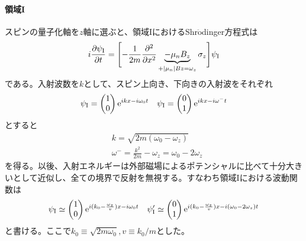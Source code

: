 \paragraph{領域I}
スピンの量子化軸を$z$軸に選ぶと、領域IにおけるShr$\ddot{\mathrm{o}}$dinger方程式は%
\begin{equation}
i\frac{\partial \psi_\mathrm{I}}{\partial t}= \Biggl[-\frac{1}{2m} \frac{\partial^2}{\partial x^2} \underbrace{-\mu_nB_z}_{+|\mu_n|Bz =\omega_z} \sigma_z\Biggr] \psi_\mathrm{I}
\end{equation}
である。入射波数を$k$として、スピン上向き、下向きの入射波をそれぞれ
\begin{align}
\psi_\mathrm{I}=\begin{pmatrix} 1\\0 \end{pmatrix} \mathrm{e}^{i k x -i\omega_0 t} && \psi_\mathrm{I}=\begin{pmatrix} 0\\1 \end{pmatrix} \mathrm{e}^{i k x -i\omega^- t}
\end{align}
とすると
\begin{align}
&k=\sqrt{2m(\omega_0-\omega_z)} \\
&\omega^-=\frac{k^2}{2m} -\omega_z=\omega_0-2\omega_z
\end{align}
を得る。以後、入射エネルギーは外部磁場によるポテンシャルに比べて十分大きいとして近似し、全ての境界で反射を無視する。すなわち領域Iにおける波動関数は
\begin{align}
\psi_\mathrm{I}\simeq \begin{pmatrix} 1\\0 \end{pmatrix} \mathrm{e}^{i (k_0-\frac{\omega_z}{v}) x -i\omega_0 t} && \psi'_\mathrm{I}\simeq \begin{pmatrix} 0\\1 \end{pmatrix} \mathrm{e}^{i (k_0-\frac{\omega_z}{v}) x -i(\omega_0-2\omega_z) t}
\end{align}
と書ける。ここで$k_0 \equiv \sqrt{2m\omega_0},v \equiv k_0/m$とした。

